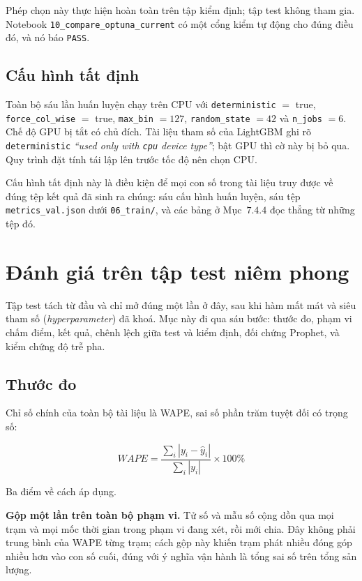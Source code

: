 \documentclass[12pt, a4paper]{report}
\begin{document}
Phép chọn này thực hiện hoàn toàn trên tập kiểm định; tập test không tham gia. Notebook
\texttt{10\_compare\_optuna\_current} có một cổng kiểm tự động cho đúng điều đó, và nó báo
\texttt{PASS}.

\FloatBarrier
\subsection{Cấu hình tất định}

Toàn bộ sáu lần huấn luyện chạy trên CPU với \texttt{deterministic} $=$ true,
\texttt{force\_col\_wise} $=$ true, \texttt{max\_bin} $=127$, \texttt{random\_state} $=42$ và
\texttt{n\_jobs} $=6$. Chế độ GPU bị tắt có chủ đích. Tài liệu tham số của LightGBM ghi rõ
\texttt{deterministic} \textit{``used only with \texttt{cpu} device type''}; bật GPU thì cờ này
bị bỏ qua. Quy trình đặt tính tái lập lên trước tốc độ nên chọn CPU.



Cấu hình tất định này là điều kiện để mọi con số trong tài liệu truy được về đúng tệp kết
quả đã sinh ra chúng: sáu cấu hình huấn luyện, sáu tệp \texttt{metrics\_val.json} dưới
\texttt{06\_train/}, và các bảng ở Mục~$7.4.4$ đọc thẳng từ những tệp đó.

\FloatBarrier
\section{Đánh giá trên tập test niêm phong}

Tập test tách từ đầu và chỉ mở đúng một lần ở đây, sau khi hàm mất mát và siêu tham số
(\textit{hyperparameter}) đã khoá. Mục này đi qua sáu bước: thước đo, phạm vi chấm điểm, kết
quả, chênh lệch giữa test và kiểm định, đối chứng Prophet, và kiểm chứng độ trễ pha.

\FloatBarrier
\subsection{Thước đo}

Chỉ số chính của toàn bộ tài liệu là WAPE, sai số phần trăm tuyệt đối có trọng số:

\begin{equation}
WAPE = \frac{\sum_i \left| y_i - \hat{y}_i \right|}{\sum_i \left| y_i \right|} \times 100\%
\end{equation}

Ba điểm về cách áp dụng.

\textbf{Gộp một lần trên toàn bộ phạm vi.} Tử số và mẫu số cộng dồn qua mọi trạm và mọi mốc
thời gian trong phạm vi đang xét, rồi mới chia. Đây không phải trung bình của WAPE từng trạm;
cách gộp này khiến trạm phát nhiều đóng góp nhiều hơn vào con số cuối, đúng với ý nghĩa vận
hành là tổng sai số trên tổng sản lượng.
\end{document}
